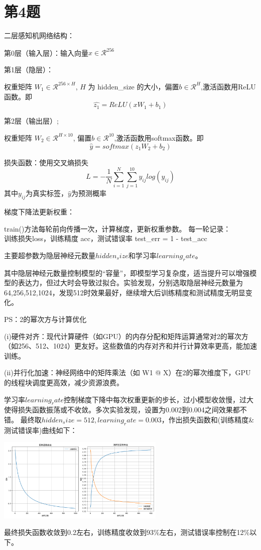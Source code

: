 \documentclass{article}
\begin{document}
\section*{第4题}

二层感知机网络结构：

第0层（输入层）：输入向量$x\in \mathcal{R}^{256}$

第1层（隐层）：

权重矩阵 $W_{1} \in \mathcal{R}^{256 \times H}$, $H$ 为 hidden\_size 的大小，偏置$b\in\mathcal{R}^{H}$,激活函数用ReLU函数。即\[ \hat{z_1}=ReLU(xW_1+b_1)\]

第2层（输出层）;

权重矩阵 $W_{2} \in \mathcal{R}^{H \times 10}$, 偏置$b\in\mathcal{R}^{10}$,激活函数用softmax函数。即\[\hat{y}=softmax(z_1W_2+b_2)\]

损失函数：使用交叉熵损失\[L=-\frac{1}{N}\sum_{i=1}^{N}\sum_{j=1}^{10}y_{ij}log(\hat{y_{ij}})\]其中$y_{ij}$为真实标签，$\hat{y}$为预测概率

梯度下降法更新权重：

train()方法每轮前向传播一次，计算梯度，更新权重参数。
每一轮记录：\\
训练损失loss，训练精度 acc，测试错误率 test\_err = 1 - test\_acc

主要超参数为隐层神经元数量$hidden_size$和学习率$learning_rate$。

其中隐层神经元数量控制模型的“容量”，即模型学习复杂度，适当提升可以增强模型的表达力，但过大时会导致过拟合。实验发现，分别选取隐层神经元数量为64,256,512,1024，发现512时效果最好，继续增大后训练精度和测试精度无明显变化。

PS：2的幂次方与计算优化

(i)硬件对齐：现代计算硬件（如GPU）的内存分配和矩阵运算通常对2的幂次方（如256、512、1024）更友好。这些数值的内存对齐和并行计算效率更高，能加速训练。

(ii)并行化加速：神经网络中的矩阵乘法（如 W1 @ X）在2的幂次维度下，GPU的线程块调度更高效，减少资源浪费。


学习率$learning_rate$控制梯度下降中每次权重更新的步长，过小模型收敛慢，过大使得损失函数振荡或不收敛。多次实验发现，设置为0.002到0.004之间效果都不错。
最终取$hidden_size=512,learning_rate=0.003$，作出损失函数和(训练精度\&测试错误率)曲线如下：

\begin{center}
    \includegraphics[width=0.6\textwidth]{0.93_0.12.png}
    \label{fig:image7}
\end{center}
最终损失函数收敛到0.2左右，训练精度收敛到93\%左右，测试错误率控制在12\%以下。
\end{document}
